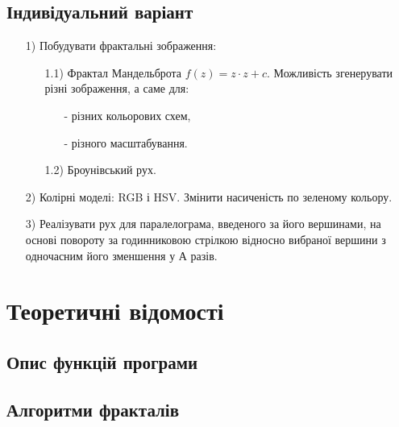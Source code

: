 \documentclass[oneside,14pt]{extarticle}
\begin{document}
\begin{normalsize}
	\subsection{Індивідуальний варіант}
	\begin{enumerate}
		\item[1)] Побудувати фрактальні зображення: \begin{enumerate}
			\item[1.1)] Фрактал Мандельброта $f(z)=z\cdot z+c$. Можливість згенерувати різні
			зображення, а саме для: \begin{enumerate}
				\item[-] різних кольорових схем,
				\item[-] різного масштабування.
			\end{enumerate}
			\item[1.2)] Броунівський рух.
		\end{enumerate}
		\item[2)] Колірні моделі: RGB і HSV. Змінити насиченість по зеленому кольору.
		\item[3)] Реалізувати рух для паралелограма, введеного за його вершинами, на основі
		повороту за годинниковою стрілкою відносно вибраної вершини з одночасним його
		зменшення у А разів.
	\end{enumerate}

	\section{Теоретичні відомості}
	\subsection{Опис функцій програми}
	\subsection{Алгоритми фракталів}

\end{normalsize}
\end{document}
